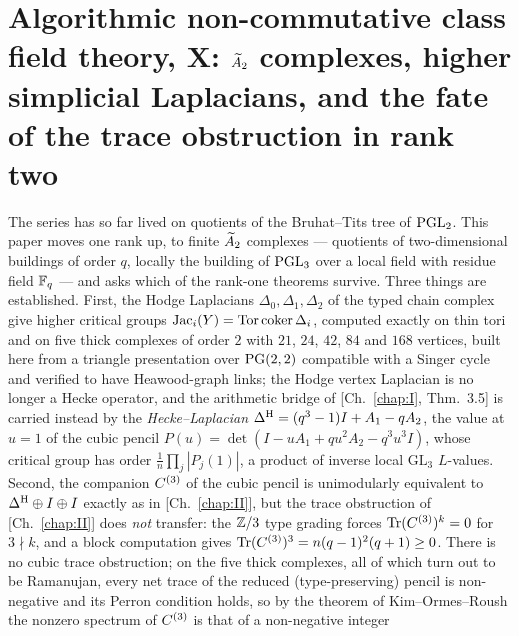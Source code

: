 \chapter[\texorpdfstring{X. $\Atwo$ complexes, higher simplicial Laplacians, and the fate of the trace obstruction in
rank two}{X. A2 complexes, higher simplicial Laplacians, and the fate of the trace obstruction in rank two}]{\texorpdfstring{Algorithmic non-commutative class field theory, X: $\Atwo$ complexes, higher simplicial Laplacians, and the fate of the trace obstruction in
rank two}{Algorithmic non-commutative class field theory, X: A2 complexes, higher simplicial Laplacians, and the fate of the trace obstruction in rank two}}\label{chap:X}
\begin{chapterabstract}
The series has so far lived on quotients of the Bruhat--Tits tree of $\mathrm{PGL}_2$. This paper
moves one rank up, to finite $\Atwo$ complexes --- quotients of two-dimensional buildings of
order $q$, locally the building of $\mathrm{PGL}_3$ over a local field with residue field $\mathbb{F}_q$ ---
and asks which of the rank-one theorems survive. Three things are established. First, the
Hodge Laplacians $\Delta_0,\Delta_1,\Delta_2$ of the typed chain complex give higher
critical groups $\operatorname{Jac}_i(Y)=\operatorname{Tor}\operatorname{coker}\Delta_i$, computed exactly on thin tori and on five
thick complexes of order $2$ with $21$, $24$, $42$, $84$ and $168$ vertices, built here from
a triangle presentation over $\mathrm{PG}(2,2)$ compatible with a Singer cycle and verified to have
Heawood-graph links; the Hodge vertex Laplacian is no longer a Hecke operator, and the
arithmetic bridge of [Ch.~\ref{chap:I}, Thm.~3.5] is carried instead by the \emph{Hecke--Laplacian}
$\Delta^{\mathrm{H}}=(q^{3}-1)I+A_1-qA_2$, the value at $u=1$ of the cubic pencil
$P(u)=\det(I-uA_1+qu^{2}A_2-q^{3}u^{3}I)$, whose critical group has order
$\frac1n\prod_j|P_j(1)|$, a product of inverse local $\mathrm{GL}_3$ $L$-values. Second,
the companion $C^{(3)}$ of the cubic pencil is unimodularly equivalent to $\Delta^{\mathrm{H}}\oplus I\oplus I$
exactly as in [Ch.~\ref{chap:II}], but the trace obstruction of [Ch.~\ref{chap:II}] does \emph{not} transfer: the $\mathbb{Z}/3$
type grading forces $\operatorname{Tr}(C^{(3)})^{k}=0$ for $3\nmid k$, and a block computation gives
$\operatorname{Tr}(C^{(3)})^{3}=n(q-1)^{2}(q+1)\ge0$. There is no cubic trace obstruction; on the five
thick complexes, all of which turn out to be Ramanujan, every net trace of the reduced
(type-preserving) pencil is non-negative and its Perron condition holds, so by the theorem
of Kim--Ormes--Roush the nonzero spectrum of $C^{(3)}$ is that of a non-negative integer

\end{chapterabstract}
